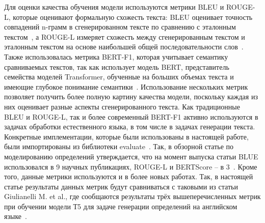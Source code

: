 \documentclass[LI,VKR]{HSEUniversity}
\begin{document}
Для оценки качества обучения модели используются метрики BLEU и ROUGE-L,
которые оценивают формальную схожесть текста: BLEU оценивает точность совпадений n-грамм
в сгенерированном тексте по сравнению с эталонным текстом~\cite{BLUE}, а ROUGE-L измеряет схожесть между
сгенерированным текстом и эталонным текстом на основе наибольшей общей последовательности слов~\cite{ROUGE}.
Также использовалась метрика BERT-F1, которая учитывает семантику сравниваемых текстов, так как
использует модель BERT, представитель семейства моделей Transformer, обученные
на больших объемах текста и имеющие глубокое понимание семантики~\cite{BERTScore}.
Использование нескольких метрик позволяет получить более полную картину качества модели,
поскольку каждая из них оценивает разные аспекты сгенерированного текста.
Как традиционные BLEU и ROUGE-L, так и более современный BERT-F1 активно используются в
задачах обработки естественного языка, в том числе в задачах генерации текста.
Конкретные имплементации, которые были использованы в настоящей работе, были импортированы из библиотеки evaluate~\cite{Evaluate}.
Так, в обзорной статье по моделированию определений утверждается, что на момент выпуска статьи BLUE использовался в 9 научных публикациях, ROUGE-L и BERTScore – в 3~\cite{DefinitionModelingReviewAndDatasetAnalysis}. Кроме того, данные метрики используются и в более новых работах.
Так, в настоящей статье результаты данных метрик будут сравниваться с таковыми из статьи
Giulianelli M. et al., где сообщаются результаты трёх вышеперечисленных метрик при обучении модели
Т5 для задаче генерации определений на английском языке~\cite{DefinitionGenerationMainArticle}.

\putbibliography %
\end{document}
